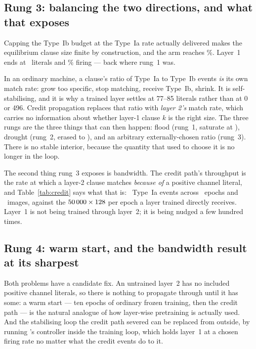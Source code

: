 \subsection{Rung 3: balancing the two directions, and what that exposes}

Capping the Type~Ib budget at the Type~Ia rate actually delivered makes the equilibrium clause
size finite by construction, and the arm reaches \accMctmCreditBal{}\%. Layer~1 ends at
\lOneSizeMctmCreditBal\ literals and \lOneFireMctmCreditBal{}\% firing --- back where rung~1
was.

\begin{ttkey}
 In an
ordinary machine, a clause's ratio of Type~Ia to Type~Ib events \emph{is} its own match rate:
grow too specific, stop matching, receive Type~Ib, shrink. It is self-stabilising, and it is
why a trained layer settles at 77--85 literals rather than at 0 or 496. Credit propagation
replaces that ratio with \emph{layer 2's} match rate, which carries no information about
whether layer-1 clause $k$ is the right size. The three rungs are the three things that can
then happen: flood (rung~1, saturate at
\lOneSizeMctmCreditIa), drought (rung~2, erased to \lOneSizeMctmCreditIb), and an arbitrary
externally-chosen ratio (rung~3). There is no stable interior, because the quantity that
used to choose it is no longer in the loop.
\end{ttkey}

The second thing rung~3 exposes is bandwidth. The credit path's throughput is the rate at
which a layer-2 clause matches \emph{because of} a positive channel literal, and
Table~\ref{tab:credit} says what that is: \eventsMctmCreditBal\ Type~Ia events across
\epochsRun\ epochs and \nTrain\ images, against the $50\,000{} \times 128$ per epoch a layer
trained directly receives. Layer~1 is not being trained through layer~2; it is being nudged a
few hundred times.

\subsection{Rung 4: warm start, and the bandwidth result at its sharpest}

Both problems have a candidate fix. An untrained layer~2 has no included positive channel
literals, so there is nothing to propagate through until it has some: a warm start --- ten
epochs of ordinary frozen training, then the credit path --- is the natural analogue of how
layer-wise pretraining is actually used. And the stabilising loop the credit path severed can
be replaced from outside, by running \ideaB's controller inside the training loop, which holds
layer~1 at a chosen firing rate no matter what the credit events do to it.

